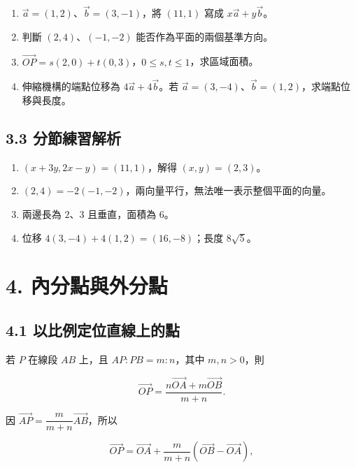 \documentclass[11pt,a4paper]{article}
\providecommand{\tightlist}{%
  \setlength{\itemsep}{0pt}\setlength{\parskip}{0pt}}
\begin{document}
\begin{enumerate}
\def\labelenumi{\arabic{enumi}.}
\tightlist
\item
  \(\vec a=(1,2)\)、\(\vec b=(3,-1)\)，將 \((11,1)\) 寫成 \(x\vec a+y\vec b\)。
\item
  判斷 \((2,4)\)、\((-1,-2)\) 能否作為平面的兩個基準方向。
\item
  \(\overrightarrow{OP}=s(2,0)+t(0,3)\)，\(0\le s,t\le1\)，求區域面積。
\item
  伸縮機構的端點位移為 \(4\vec a+4\vec b\)。若 \(\vec a=(3,-4)\)、\(\vec b=(1,2)\)，求端點位移與長度。
\end{enumerate}

\subsection{3.3 分節練習解析}\label{ux5206ux7bc0ux7df4ux7fd2ux89e3ux6790-2}

\begin{enumerate}
\def\labelenumi{\arabic{enumi}.}
\tightlist
\item
  \((x+3y,2x-y)=(11,1)\)，解得 \((x,y)=(2,3)\)。
\item
  \((2,4)=-2(-1,-2)\)，兩向量平行，無法唯一表示整個平面的向量。
\item
  兩邊長為 \(2\)、\(3\) 且垂直，面積為 \(6\)。
\item
  位移 \(4(3,-4)+4(1,2)=(16,-8)\)；長度 \(8\sqrt5\)。
\end{enumerate}

\section{4. 內分點與外分點}\label{ux5167ux5206ux9edeux8207ux5916ux5206ux9ede}

\subsection{4.1 以比例定位直線上的點}\label{ux4ee5ux6bd4ux4f8bux5b9aux4f4dux76f4ux7ddaux4e0aux7684ux9ede}

若 \(P\) 在線段 \(AB\) 上，且 \(AP:PB=m:n\)，其中 \(m,n>0\)，則

\[
\overrightarrow{OP}
=\frac{n\overrightarrow{OA}+m\overrightarrow{OB}}{m+n}.
\]

因 \(\overrightarrow{AP}=\dfrac{m}{m+n}\overrightarrow{AB}\)，所以

\[
\overrightarrow{OP}=\overrightarrow{OA}+\frac{m}{m+n}(\overrightarrow{OB}-\overrightarrow{OA}),
\]
\end{document}
